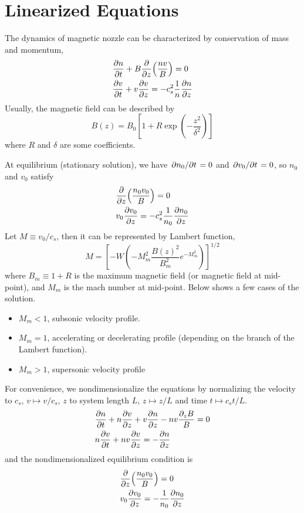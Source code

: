 \section{Linearized Equations}
The dynamics of magnetic nozzle can be characterized by conservation of mass and momentum,
\begin{align*}
    &\pdv{n}{t} + B\pdv{z}(\frac{nv}{B}) = 0\\
    &\pdv{v}{t} + v\pdv{v}{z} = -c_s^2\frac{1}{n}\pdv{n}{z}
\end{align*}
Usually, the magnetic field can be described by
\[ B(z) = B_0\left[ 1 + R\exp(-\frac{z^2}{\delta^2}) \right] \]
where $R$ and $\delta$ are some coefficients.

At equilibrium (stationary solution), we have $\pdv*{n_0}{t}=0$ and $\pdv*{v_0}{t}=0$, so $n_0$ and $v_0$ satisfy
\begin{align*}
    &\pdv{z}(\frac{n_0v_0}{B}) = 0 \\
    &v_0\pdv{v_0}{z} = -c_s^2\frac{1}{n_0}\pdv{n_0}{z} 
\end{align*}
Let $M\equiv v_0/c_s$, then it can be represented by Lambert function, 
\[ M = \left[ -W\left(-M_m^2 \frac{B(z)^2}{B_m^2}e^{-M_m^2}\right) \right]^{1/2} \]
where $B_m\equiv 1+R$ is the maximum magnetic field (or magnetic field at mid-point), and $M_m$ is the mach number at mid-point. Below shows a few cases of the solution.
\begin{itemize}
    \item $M_m < 1$, subsonic velocity profile.
    \item $M_m = 1$, accelerating or decelerating profile (depending on the branch of the Lambert function).
    \item $M_m > 1$, supersonic velocity profile
\end{itemize}



For convenience, we nondimensionalize the equations by normalizing the velocity to $c_s$, $v\mapsto v/c_s$, $z$ to system length $L$, $z \mapsto z/L$ and time $t\mapsto c_s t/L$.
\begin{align}
    &\pdv{n}{t} + n\pdv{v}{z} + v\pdv{n}{z} - nv\frac{\partial_z B}{B} = 0 \\
    &n\pdv{v}{t} + nv\pdv{v}{z} = -\pdv{n}{z}
\end{align}
and the nondimensionalized equilibrium condition is
\begin{align}
    &\pdv{z}(\frac{n_0v_0}{B}) = 0 \label{eq:equilibrium-convervation-of-mass}\\
    &v_0\pdv{v_0}{z} = -\frac{1}{n_0}\pdv{n_0}{z} \label{eq:equilibrium-convervation-of-momentum}
\end{align}


